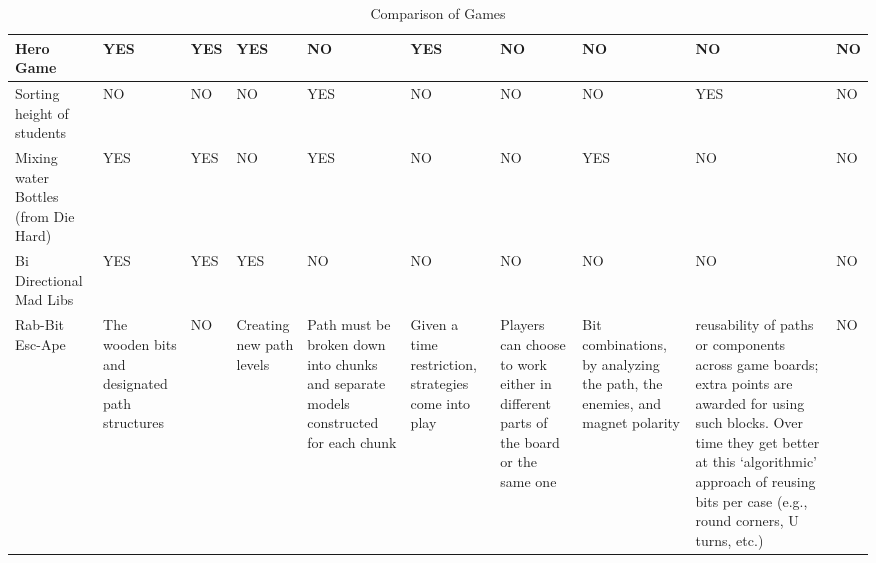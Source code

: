 \documentclass{acm_proc_article-sp}
\begin{document}
\begin{sidewaystable}[htbp]
\begin{tabular}{|p{1.5cm}||p{1.5cm}|p{2.5cm}|p{2.5cm}|p{2.7cm}|p{2cm}|p{1.5cm}|p{2cm}|p{3.5cm}|p{1.5cm}|}
    Hero Game 
      & \cellcolor{blue!25}YES 
      & \cellcolor{blue!25}YES 
      & \cellcolor{blue!25}YES 
      & NO 
      & \cellcolor{blue!25}YES 
      & NO 
      & NO 
      & NO 
      & NO \\ \hline
    
    Sorting height of students 
      & NO 
      & NO 
      & NO 
      & \cellcolor{blue!25}YES 
      & NO 
      & NO 
      & NO 
      & \cellcolor{blue!25}YES 
      & NO \\ \hline
    
    
    Mixing water Bottles (from Die Hard\cite{diehard2008thorp}) 
      & \cellcolor{blue!25}YES 
      & \cellcolor{blue!25}YES 
      & NO 
      & \cellcolor{blue!25}YES 
      & NO 
      & NO 
      & \cellcolor{blue!25}YES 
      & NO 
      & NO \\ \hline
    
    Bi Directional Mad Libs 
      & \cellcolor{blue!25}YES 
      & \cellcolor{blue!25}YES 
      & \cellcolor{blue!25}YES 
      & NO 
      & NO 
      & NO 
      & NO 
      & NO 
      & NO \\ \hline
    
    Rab-Bit Esc-Ape 
      & \raggedright{The wooden bits and designated path structures} 
      & NO 
      & \raggedright{Creating new path levels} 
      & \raggedright{Path must be broken down into chunks and separate models constructed for each chunk} 
      & \raggedright{Given a time restriction, strategies come into play} 
      & \raggedright{Players can choose to work either in different parts of the board or the same one} 
      & \raggedright{Bit combinations, by analyzing the path, the enemies, and magnet polarity}
      & \raggedright{reusability of paths or components across game boards; extra points are awarded for using such blocks.
        Over time they get better at this `algorithmic' approach of reusing bits per case (e.g., round corners, U turns, etc.)} 
      & NO \\ \hline

    \end{tabular}\hspace*{-1cm}\vspace*{-1cm}
    \hspace*{1cm}\vspace*{1cm}\caption{Comparison of Games}
    \label{table:games-comparison}
\end{sidewaystable}
\end{document}
